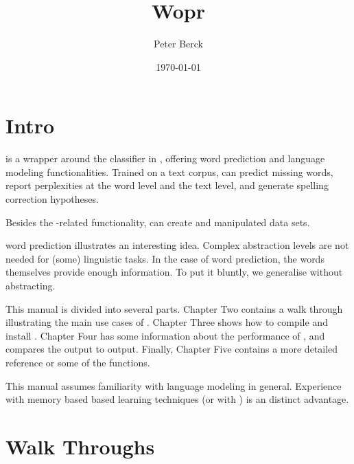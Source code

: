 \documentclass[a4paper,10pt,twoside]{report}
\begin{document}
\title{Wopr}
\author{Peter Berck}
\date{\today}

\maketitle

\clearpage
\tableofcontents


\chapter{Intro}

\Wopr{} is a wrapper around the \knn{} classifier in \Timbl{},
offering word prediction and language modeling
functionalities. Trained on a text corpus, \wopr{} can predict missing
words, report perplexities at the word level and the text level, and
generate spelling correction hypotheses.

\par
Besides the \Timbl{}-related functionality, \wopr{} can create and
manipulated data sets.

\par

\Mb{} word prediction illustrates an interesting idea. Complex
abstraction levels are not needed for (some) linguistic
tasks. In the case of word prediction, the words themselves provide
enough information. To put it bluntly, we generalise without
abstracting. 

\par
This manual is divided into several parts. Chapter Two contains a walk
through illustrating the main use cases of \wopr{}. Chapter Three
shows how to compile and install \wopr{}. Chapter Four has some
information about the performance of \wopr{}, and compares the output
to \srilm{} output. Finally, Chapter Five contains a more detailed
reference or some of the \wopr{} functions.

\par
This manual assumes familiarity with language modeling in
general. Experience with memory based based learning techniques (or
with \Timbl{}) is an distinct advantage.


\chapter{Walk Throughs}
\end{document}
